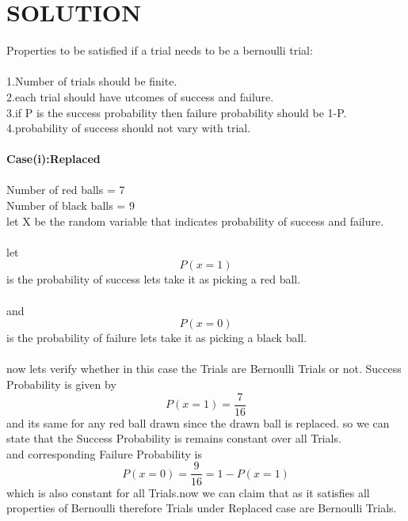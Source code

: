 \documentclass[journal,12pt,twocolumn]{IEEEtran}
\begin{document}
\section{SOLUTION}
Properties to be satisfied if a trial needs to be a bernoulli trial:\\ \\
1.Number of trials should be finite.\\
2.each trial should have utcomes of success and failure.\\
3.if P is the success probability then failure probability should be 1-P.\\
4.probability of success should not vary with trial.\\ \\
\textbf{Case(i):Replaced}\\ \\
Number of red balls = 7\\
Number of black balls = 9\\
let X be the random variable that indicates probability of success and failure.\\ \\
let
\begin{equation*}
    P(x=1)
\end{equation*} is the probability of success lets take it as picking a red ball.\\\\
and 
\begin{equation*}
    P(x=0)
\end{equation*} is the probability of failure lets take it as picking a black ball.\\\\
now lets verify whether in this case the Trials are Bernoulli Trials or not.
Success Probability is given by
\begin{equation*}
    P(x=1) = \frac{7}{16} 
\end{equation*}
 and its same for any red ball drawn since the drawn ball is replaced. so we can state that the Success Probability is remains constant over all Trials.\\and corresponding Failure Probability is
 \begin{equation*}
     P(x=0) = \frac{9}{16} = 1-P(x=1)
 \end{equation*}
 which is also constant for all Trials.now we can claim that
 as it satisfies all properties of Bernoulli therefore Trials under Replaced case are Bernoulli Trials.\\ \\
\end{document}
